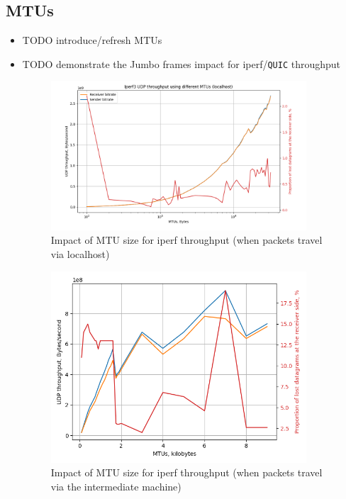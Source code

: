 \documentclass[12pt,a4paper,twoside,openright]{report}
\begin{document}
\subsection{MTUs}
\begin{itemize}
  \item TODO introduce/refresh MTUs
  \item TODO demonstrate the Jumbo frames impact for iperf/\texttt{QUIC} throughput
  
  
  
    \begin{figure}[H]
    \centering
    \includegraphics[width=0.9\textwidth]{figs/Iperf3 UDP throughput using different MTUs (localhost).png}
    \caption{Impact of MTU size for iperf throughput (when packets travel via localhost)}
    \label{fig:MTU_impact_for_localhost_iperf_throughput}
    \end{figure}
    
    \begin{figure}[H]
    \centering
    \includegraphics[width=0.9\textwidth]{figs/Iperf3 UDP throughput using different MTUs (A1-to-B-to-A2).png}
    \caption{Impact of MTU size for iperf throughput (when packets travel via the intermediate machine)}
    \label{fig:}
    \end{figure}
  

\end{itemize}
\end{document}

